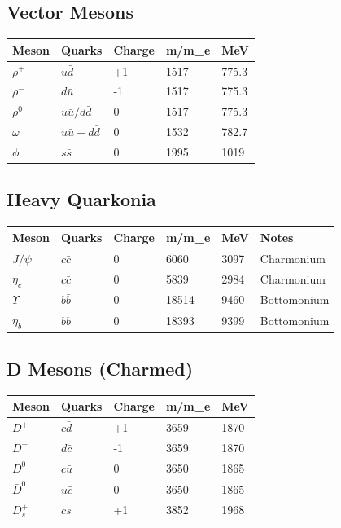 \documentclass[
  11pt,
  letterpaper,
  twoside,
  openright]{book}
\begin{document}
\subsection{Vector Mesons}\label{vector-mesons}

\begin{longtable}[]{@{}lllll@{}}
\toprule\noalign{}
Meson & Quarks & Charge & m/m\_e & MeV \\
\midrule\noalign{}
\endhead
\bottomrule\noalign{}
\endlastfoot
\(\rho^+\) & \(u\bar{d}\) & +1 & 1517 & 775.3 \\
\(\rho^-\) & \(d\bar{u}\) & -1 & 1517 & 775.3 \\
\(\rho^0\) & \(u\bar{u}/d\bar{d}\) & 0 & 1517 & 775.3 \\
\(\omega\) & \(u\bar{u}+d\bar{d}\) & 0 & 1532 & 782.7 \\
\(\phi\) & \(s\bar{s}\) & 0 & 1995 & 1019 \\
\end{longtable}

\subsection{Heavy Quarkonia}\label{heavy-quarkonia}

\begin{longtable}[]{@{}llllll@{}}
\toprule\noalign{}
Meson & Quarks & Charge & m/m\_e & MeV & Notes \\
\midrule\noalign{}
\endhead
\bottomrule\noalign{}
\endlastfoot
\(J/\psi\) & \(c\bar{c}\) & 0 & 6060 & 3097 & Charmonium \\
\(\eta_c\) & \(c\bar{c}\) & 0 & 5839 & 2984 & Charmonium \\
\(\Upsilon\) & \(b\bar{b}\) & 0 & 18514 & 9460 & Bottomonium \\
\(\eta_b\) & \(b\bar{b}\) & 0 & 18393 & 9399 & Bottomonium \\
\end{longtable}

\subsection{D Mesons (Charmed)}\label{d-mesons-charmed}

\begin{longtable}[]{@{}lllll@{}}
\toprule\noalign{}
Meson & Quarks & Charge & m/m\_e & MeV \\
\midrule\noalign{}
\endhead
\bottomrule\noalign{}
\endlastfoot
\(D^+\) & \(c\bar{d}\) & +1 & 3659 & 1870 \\
\(D^-\) & \(d\bar{c}\) & -1 & 3659 & 1870 \\
\(D^0\) & \(c\bar{u}\) & 0 & 3650 & 1865 \\
\(\bar{D}^0\) & \(u\bar{c}\) & 0 & 3650 & 1865 \\
\(D_s^+\) & \(c\bar{s}\) & +1 & 3852 & 1968 \\
\end{longtable}
\end{document}
